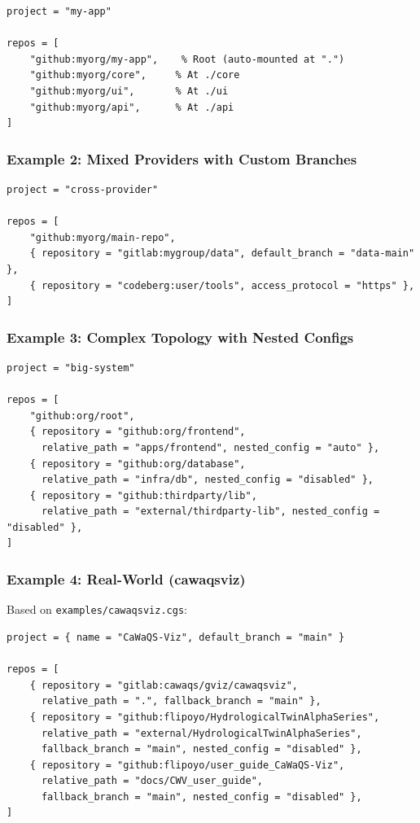 \begin{lstlisting}
project = "my-app"

repos = [
    "github:myorg/my-app",    % Root (auto-mounted at ".")
    "github:myorg/core",     % At ./core
    "github:myorg/ui",       % At ./ui
    "github:myorg/api",      % At ./api
]
\end{lstlisting}

\subsubsection{Example 2: Mixed Providers with Custom Branches}

\begin{lstlisting}
project = "cross-provider"

repos = [
    "github:myorg/main-repo",
    { repository = "gitlab:mygroup/data", default_branch = "data-main" },
    { repository = "codeberg:user/tools", access_protocol = "https" },
]
\end{lstlisting}

\subsubsection{Example 3: Complex Topology with Nested Configs}

\begin{lstlisting}
project = "big-system"

repos = [
    "github:org/root",
    { repository = "github:org/frontend", 
      relative_path = "apps/frontend", nested_config = "auto" },
    { repository = "github:org/database", 
      relative_path = "infra/db", nested_config = "disabled" },
    { repository = "github:thirdparty/lib", 
      relative_path = "external/thirdparty-lib", nested_config = "disabled" },
]
\end{lstlisting}

\subsubsection{Example 4: Real-World (cawaqsviz)}

Based on \texttt{examples/cawaqsviz.cgs}:

\begin{lstlisting}
project = { name = "CaWaQS-Viz", default_branch = "main" }

repos = [
    { repository = "gitlab:cawaqs/gviz/cawaqsviz", 
      relative_path = ".", fallback_branch = "main" },
    { repository = "github:flipoyo/HydrologicalTwinAlphaSeries", 
      relative_path = "external/HydrologicalTwinAlphaSeries", 
      fallback_branch = "main", nested_config = "disabled" },
    { repository = "github:flipoyo/user_guide_CaWaQS-Viz", 
      relative_path = "docs/CWV_user_guide", 
      fallback_branch = "main", nested_config = "disabled" },
]
\end{lstlisting}


